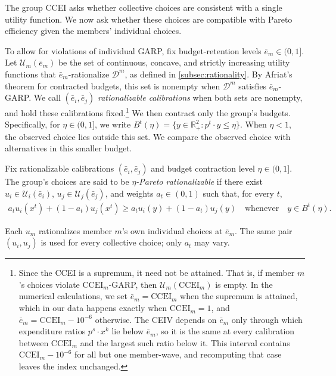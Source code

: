 \documentclass[11 pt]{article}
\begin{document}
The group CCEI asks whether collective choices are consistent with a single utility function. We now ask whether these choices are compatible with Pareto efficiency given the members' individual choices.

To allow for violations of individual GARP, fix budget-retention levels $\bar e_m\in(0,1]$. Let $\mathcal U_m(\bar e_m)$ be the set of continuous, concave, and strictly increasing utility functions that $\bar e_m$-rationalize $\mathcal D^m$, as defined in \autoref{subsec:rationality}. By Afriat's theorem for contracted budgets, this set is nonempty when $\mathcal D^m$ satisfies $\bar e_m$-GARP. We call $(\bar e_i,\bar e_j)$ \emph{rationalizable calibrations} when both sets are nonempty, and hold these calibrations fixed.\footnote{Since the CCEI is a supremum, it need not be attained. That is, if member $m$'s choices violate $\mathrm{CCEI}_m$-GARP, then $\mathcal U_m(\mathrm{CCEI}_m)$ is empty. In the numerical calculations, we set $\bar e_m=\mathrm{CCEI}_m$ when the supremum is attained, which in our data happens exactly when $\mathrm{CCEI}_m=1$, and $\bar e_m=\mathrm{CCEI}_m-10^{-6}$ otherwise. The CEIV depends on $\bar e_m$ only through which expenditure ratios $p^s\cdot x^k$ lie below $\bar e_m$, so it is the same at every calibration between $\mathrm{CCEI}_m$ and the largest such ratio below it. This interval contains $\mathrm{CCEI}_m-10^{-6}$ for all but one member-wave, and recomputing that case leaves the index unchanged.} We then contract only the group's budgets. Specifically, for $\eta\in(0,1]$, we write $B^t(\eta)=\{ y \in \mathbb R^2_+ : p^t\cdot y\leq\eta\}$. When $\eta<1$, the observed choice lies outside this set. We compare the observed choice with alternatives in this smaller budget.

\begin{definition}\label{def:collv2_pareto}\normalfont
Fix rationalizable calibrations $(\bar e_{i}, \bar e_{j})$ and budget contraction level $\eta \in (0,1]$. The group's choices are said to be \emph{$\eta$-Pareto rationalizable} if there exist $u_{i} \in \mathcal{U}_{i}(\bar e_{i})$, $u_{j} \in \mathcal{U}_{j}(\bar e_{j})$, and weights $a_{t} \in (0,1)$ such that, for every $t$,
\begin{align}\label{eqn:collv2_fit}
a_{t} u_{i}(x^{t}) + (1-a_{t}) u_{j}(x^{t}) \geq a_{t} u_{i}(y) + (1-a_{t}) u_{j}(y) \quad \text{whenever} \quad y \in B^{t}(\eta).
\end{align}
\end{definition}

Each $u_m$ rationalizes member $m$'s own individual choices at $\bar e_m$. The same pair $(u_i,u_j)$ is used for every collective choice; only $a_t$ may vary.
\end{document}
